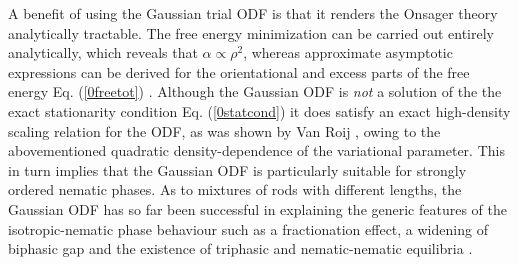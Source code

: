 \documentclass[amssymb]{revtex4}
\begin{document}
A benefit of using the Gaussian trial ODF 
is that it renders the Onsager theory analytically tractable.
The free energy minimization can be carried out entirely analytically,
which reveals that $\alpha\propto \rho^{2}$, 
whereas approximate asymptotic expressions 
can be derived for the orientational and
excess parts of the free energy Eq. (\ref{0freetot}) \cite{Vroege92,OdijkLekkerkerker}. 
Although the Gaussian ODF
is {\em not} a solution of the the exact stationarity condition Eq. (\ref{0statcond})
it  does satisfy an exact high-density scaling relation for the
ODF, as was shown by Van Roij \cite{vanroijmulderscaling},
 owing to the abovementioned 
quadratic density-dependence of the variational parameter.
This in turn implies that the Gaussian ODF is particularly suitable
for strongly ordered nematic phases. 
As to  mixtures of rods with different lengths, the Gaussian ODF
has so far been successful in explaining the generic features of the isotropic-nematic
phase behaviour 
such as a fractionation effect, a widening of biphasic gap \cite{OdijkLekkerkerker} and the
existence of triphasic and nematic-nematic equilibria \cite{LekkerVroeg}.







\end{document}
